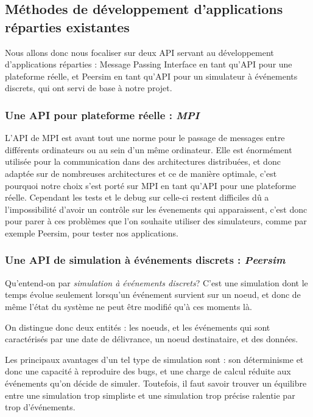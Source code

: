 \documentclass{article}
\begin{document}
			\subsection{Méthodes de développement d'applications réparties existantes}

				Nous allons donc nous focaliser sur deux API servant au développement d'applications réparties : Message Passing Interface en tant qu'API pour une plateforme réelle, et Peersim en tant qu'API pour un simulateur à événements discrets, qui ont servi de base à notre projet.

				\subsubsection{Une API pour plateforme réelle : \textit{MPI}}
					L'API de MPI est avant tout une norme pour le passage de messages entre différents ordinateurs ou au sein d'un même ordinateur.
					Elle est énormément utilisée pour la communication dans des architectures distribuées, et donc adaptée sur de nombreuses architectures et ce de manière optimale, c'est pourquoi notre choix s'est porté sur MPI en tant qu'API pour une plateforme réelle.
					Cependant les tests et le debug sur celle-ci restent difficiles dû a l'impossibilité d'avoir un contrôle sur les évenements qui apparaissent, c'est donc pour parer à ces problèmes que l'on souhaite utiliser des simulateurs, comme par exemple Peersim, pour tester nos applications.
				
				
				\subsubsection{Une API de simulation à événements discrets : \textit{Peersim}}
					Qu'entend-on par \textit{simulation à événements discrets}? C'est une simulation dont le temps évolue seulement lorsqu'un événement survient sur un noeud, et donc de même l'état du système ne peut être modifié qu'à ces moments là.

					On distingue donc deux entités : les noeuds, et les événements qui sont caractérisés par une date de délivrance, un noeud destinataire, et des données.

					Les principaux avantages d'un tel type de simulation sont : son déterminisme et donc une capacité à reproduire des bugs, et une charge de calcul réduite aux événements qu'on décide de simuler. Toutefois, il faut savoir trouver un équilibre entre une simulation trop simpliste et une simulation trop précise ralentie par trop d'événements.
\end{document}
